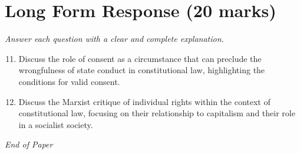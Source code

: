 \documentclass[12pt]{article}
\begin{document}
\section*{Long Form Response (20 marks)}
\textit{Answer each question with a clear and complete explanation.}
\begin{enumerate}[label=\arabic*.]
\setcounter{enumi}{10}
\item Discuss the role of consent as a circumstance that can preclude the wrongfulness of state conduct in constitutional law, highlighting the conditions for valid consent.
\item Discuss the Marxist critique of individual rights within the context of constitutional law, focusing on their relationship to capitalism and their role in a socialist society.
\end{enumerate}

\vfill
\noindent\textit{End of Paper}
\end{document}
